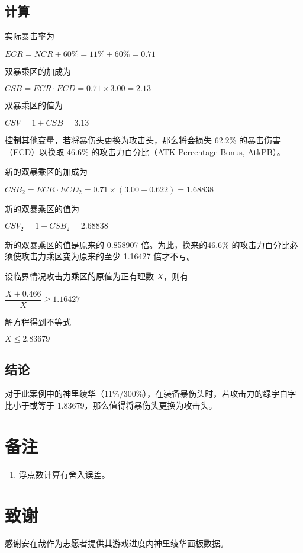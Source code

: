 \documentclass[a4paper,10pt]{article}
\newcommand{\centerblk}[1]{
    \begin{minipage}{\linewidth}
        \center#1
    \end{minipage}
}
\begin{document}
\subsection{计算}

实际暴击率为

\centerblk{$ECR = NCR + 60\% = 11\% + 60\% = 0.71$}

双暴乘区的加成为

\centerblk{$CSB = ECR \cdot ECD = 0.71 \times 3.00 = 2.13$}

双暴乘区的值为

\centerblk{$CSV = 1 + CSB = 3.13$}

控制其他变量，若将暴伤头更换为攻击头，那么将会损失 62.2\% 的暴击伤害（ECD）以换取 46.6\% 的攻击力百分比（ATK Percentage Bonus, AtkPB）。

新的双暴乘区的加成为

\centerblk{$CSB_2 = ECR \cdot ECD_2 = 0.71 \times (3.00 - 0.622) = 1.68838$}

新的双暴乘区的值为

\centerblk{$CSV_2 = 1 + CSB_2 = 2.68838$}

新的双暴乘区的值是原来的 0.858907 倍。为此，换来的46.6\% 的攻击力百分比必须使攻击力乘区变为原来的至少 1.16427 倍才不亏。

设临界情况攻击力乘区的原值为正有理数 $X$，则有

\centerblk{$\dfrac{X + 0.466}{X} \geqslant 1.16427$}

解方程得到不等式

\centerblk{$X \leqslant 2.83679$}

\subsection{结论}

对于此案例中的神里绫华（11\%/300\%），在装备暴伤头时，若攻击力的绿字白字比小于或等于 1.83679，那么值得将暴伤头更换为攻击头。




\section{备注}

\begin{enumerate}
	\item 浮点数计算有舍入误差。
\end{enumerate}



\section{致谢}

感谢安在哉作为志愿者提供其游戏进度内神里绫华面板数据。
\end{document}
